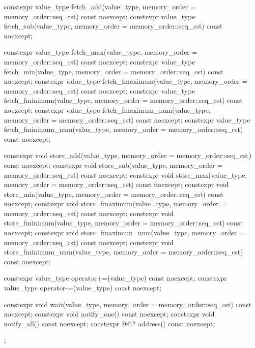 \begin{codeblock}
{{    constexpr value_type fetch_add(value_type,
                                   memory_order = memory_order::seq_cst) const noexcept;
    constexpr value_type fetch_sub(value_type,
                                   memory_order = memory_order::seq_cst) const noexcept;

    constexpr value_type fetch_max(value_type,
                                   memory_order = memory_order::seq_cst) const noexcept;
    constexpr value_type fetch_min(value_type,
                                   memory_order = memory_order::seq_cst) const noexcept;
    constexpr value_type fetch_fmaximum(value_type,
                                        memory_order = memory_order::seq_cst) const noexcept;
    constexpr value_type fetch_fminimum(value_type,
                                        memory_order = memory_order::seq_cst) const noexcept;
    constexpr value_type fetch_fmaximum_num(value_type,
                                            memory_order = memory_order::seq_cst) const noexcept;
    constexpr value_type fetch_fminimum_num(value_type,
                                            memory_order = memory_order::seq_cst) const noexcept;

    constexpr void store_add(value_type, memory_order = memory_order::seq_cst) const noexcept;
    constexpr void store_sub(value_type, memory_order = memory_order::seq_cst) const noexcept;
    constexpr void store_max(value_type, memory_order = memory_order::seq_cst) const noexcept;
    constexpr void store_min(value_type, memory_order = memory_order::seq_cst) const noexcept;
    constexpr void store_fmaximum(value_type,
                                  memory_order = memory_order::seq_cst) const noexcept;
    constexpr void store_fminimum(value_type,
                                  memory_order = memory_order::seq_cst) const noexcept;
    constexpr void store_fmaximum_num(value_type,
                                      memory_order = memory_order::seq_cst) const noexcept;
    constexpr void store_fminimum_num(value_type,
                                      memory_order = memory_order::seq_cst) const noexcept;

    constexpr value_type operator+=(value_type) const noexcept;
    constexpr value_type operator-=(value_type) const noexcept;

    constexpr void wait(value_type,
                        memory_order = memory_order::seq_cst) const noexcept;
    constexpr void notify_one() const noexcept;
    constexpr void notify_all() const noexcept;
    constexpr @@* address() const noexcept;
  };
}
\end{codeblock}

